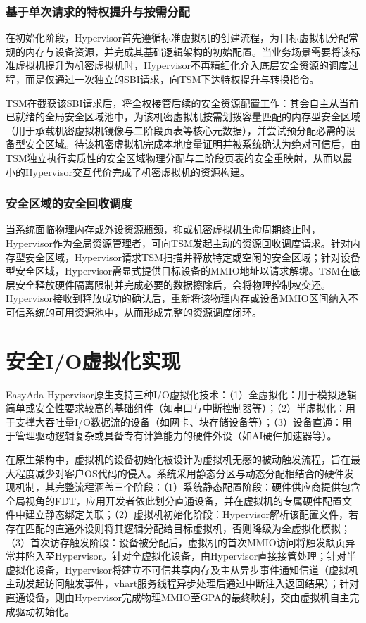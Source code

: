 \documentclass[master, vlined, review]{DissertUESTC}
\begin{document}
	\subsubsection{基于单次请求的特权提升与按需分配}
	在初始化阶段，Hypervisor首先遵循标准虚拟机的创建流程，为目标虚拟机分配常规的内存与设备资源，并完成其基础逻辑架构的初始配置。当业务场景需要将该标准虚拟机提升为机密虚拟机时，Hypervisor不再精细化介入底层安全资源的调度过程，而是仅通过一次独立的SBI请求，向TSM下达特权提升与转换指令。
	
	TSM在截获该SBI请求后，将全权接管后续的安全资源配置工作：其会自主从当前已就绪的全局安全区域池中，为该机密虚拟机按需划拨容量匹配的内存型安全区域（用于承载机密虚拟机镜像与二阶段页表等核心元数据），并尝试预分配必需的设备型安全区域。待该机密虚拟机完成本地度量证明并被系统确认为绝对可信后，由TSM独立执行实质性的安全区域物理分配与二阶段页表的安全重映射，从而以最小的Hypervisor交互代价完成了机密虚拟机的资源构建。
	
	\subsubsection{安全区域的安全回收调度}
	当系统面临物理内存或外设资源瓶颈，抑或机密虚拟机生命周期终止时，Hypervisor作为全局资源管理者，可向TSM发起主动的资源回收调度请求。针对内存型安全区域，Hypervisor请求TSM扫描并释放特定或空闲的安全区域；针对设备型安全区域，Hypervisor需显式提供目标设备的MMIO地址以请求解绑。TSM在底层安全释放硬件隔离限制并完成必要的数据擦除后，会将物理控制权交还。Hypervisor接收到释放成功的确认后，重新将该物理内存或设备MMIO区间纳入不可信系统的可用资源池中，从而形成完整的资源调度闭环。

	\section{安全I/O虚拟化实现}
	EasyAda-Hypervisor原生支持三种I/O虚拟化技术：（1）全虚拟化：用于模拟逻辑简单或安全性要求较高的基础组件（如串口与中断控制器等）；（2）半虚拟化：用于支撑大吞吐量I/O数据流的设备（如网卡、块存储设备等）；（3）设备直通：用于管理驱动逻辑复杂或具备专有计算能力的硬件外设（如AI硬件加速器等）。
	
	在原生架构中，虚拟机的设备初始化被设计为虚拟机无感的被动触发流程，旨在最大程度减少对客户OS代码的侵入。系统采用静态分区与动态分配相结合的硬件发现机制，其完整流程涵盖三个阶段：（1）系统静态配置阶段：硬件供应商提供包含全局视角的FDT，应用开发者依此划分直通设备，并在虚拟机的专属硬件配置文件中建立静态绑定关联；（2）虚拟机初始化阶段：Hypervisor解析该配置文件，若存在匹配的直通外设则将其逻辑分配给目标虚拟机，否则降级为全虚拟化模拟；（3）首次访存触发阶段：设备被分配后，虚拟机的首次MMIO访问将触发缺页异常并陷入至Hypervisor。针对全虚拟化设备，由Hypervisor直接接管处理；针对半虚拟化设备，Hypervisor将建立不可信共享内存及主从异步事件通知信道（虚拟机主动发起访问触发事件，vhart服务线程异步处理后通过中断注入返回结果）；针对直通设备，则由Hypervisor完成物理MMIO至GPA的最终映射，交由虚拟机自主完成驱动初始化。
	
\end{document}
